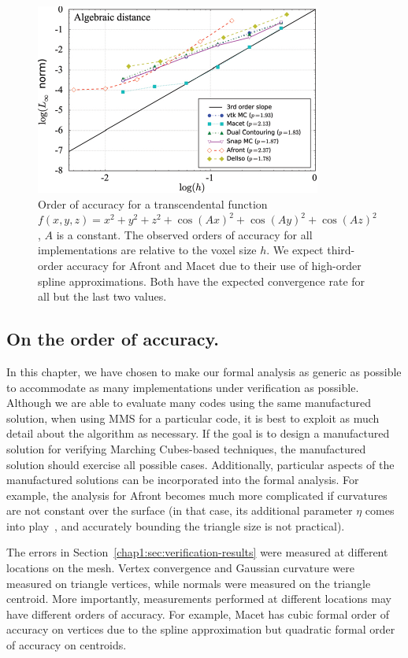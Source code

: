 \begin{figure}[b]
\centering
\includegraphics[width=0.6\linewidth,keepaspectratio=true]{chapter2/figures/afront_meshconv-onh.pdf}
  \caption{Order of accuracy for a transcendental function 
$f(x,y,z) = x^2 + y^2 + z^2 + \cos(Ax)^2 + \cos(Ay)^2 + \cos(Az)^2$, $A$ 
is a constant. The observed orders of accuracy for all implementations 
are relative to the voxel size $h$.
We expect third-order accuracy for 
Afront and Macet due to their use of high-order spline approximations.
Both have the expected convergence rate for all but the last two values.}
  \label{fig:afront-meshconvonh}
\end{figure}


\subsection{On the order of accuracy.}
In this chapter, we have chosen to make our formal analysis as generic
as possible to accommodate as many implementations under verification
as possible. Although we are able to evaluate many codes using the same 
manufactured solution, when using MMS for a particular code, it is best to
exploit as much detail about the algorithm as necessary. If the goal is to 
design a manufactured solution for verifying Marching Cubes-based techniques, 
the manufactured solution should exercise all possible cases. %
Additionally, particular aspects of the manufactured solutions can be
incorporated into the formal analysis. For example, the analysis for
Afront becomes much more complicated if curvatures are not constant
over the surface (in that case, its additional parameter $\eta$ comes
into play~\cite{Schreiner06}, and accurately bounding the triangle
size is not practical).


The errors in Section~\ref{chap1:sec:verification-results} were
measured at different locations on the mesh. Vertex convergence and
Gaussian curvature were measured on triangle vertices, while normals
were measured on the triangle centroid. 
More importantly, measurements
performed at different locations may have different orders of
accuracy. For example,
Macet has cubic formal order of accuracy on vertices due to the spline approximation
but quadratic formal order of accuracy on centroids.

